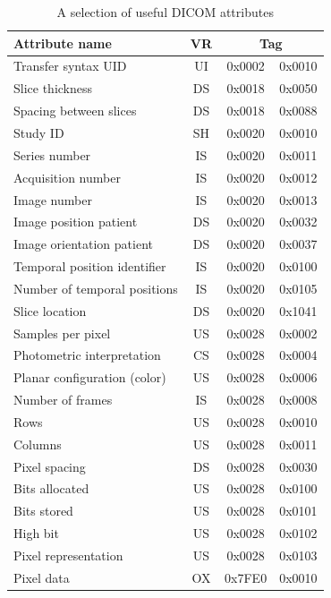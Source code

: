 \begin{table}[ht]
   \centering
   \caption{A selection of useful DICOM attributes \label{tbl:dicom:attribute}}
   \smallskip
   \begin{tabular}{|lcc@{, }c|}
      \hline
      Attribute name & VR & \multicolumn{2}{c|}{Tag}\\
      \hline
      Transfer syntax UID & UI & 0x0002 & 0x0010\\[0.5em]
      Slice thickness & DS & 0x0018 & 0x0050\\
      Spacing between slices & DS & 0x0018 & 0x0088\\[0.5em]
      Study ID & SH & 0x0020 & 0x0010\\
      Series number & IS & 0x0020 & 0x0011\\
      Acquisition number & IS & 0x0020 & 0x0012\\
      Image number & IS & 0x0020 & 0x0013\\
      Image position patient & DS & 0x0020 & 0x0032\\
      Image orientation patient & DS & 0x0020 & 0x0037\\
      Temporal position identifier & IS & 0x0020 & 0x0100\\
      Number of temporal positions & IS & 0x0020 & 0x0105\\
      Slice location & DS & 0x0020 & 0x1041\\[0.5em]
      Samples per pixel & US & 0x0028 & 0x0002\\
      Photometric interpretation & CS & 0x0028 & 0x0004\\
      Planar configuration (color) & US & 0x0028 & 0x0006\\
      Number of frames & IS & 0x0028 & 0x0008\\
      Rows & US & 0x0028 & 0x0010\\
      Columns & US & 0x0028 & 0x0011\\
      Pixel spacing & DS & 0x0028 & 0x0030\\
      Bits allocated & US & 0x0028 & 0x0100\\
      Bits stored & US & 0x0028 & 0x0101\\
      High bit & US & 0x0028 & 0x0102\\
      Pixel representation & US & 0x0028 & 0x0103\\[0.5em]
      Pixel data & OX & 0x7FE0 & 0x0010\\
      \hline
   \end{tabular}
\end{table}

